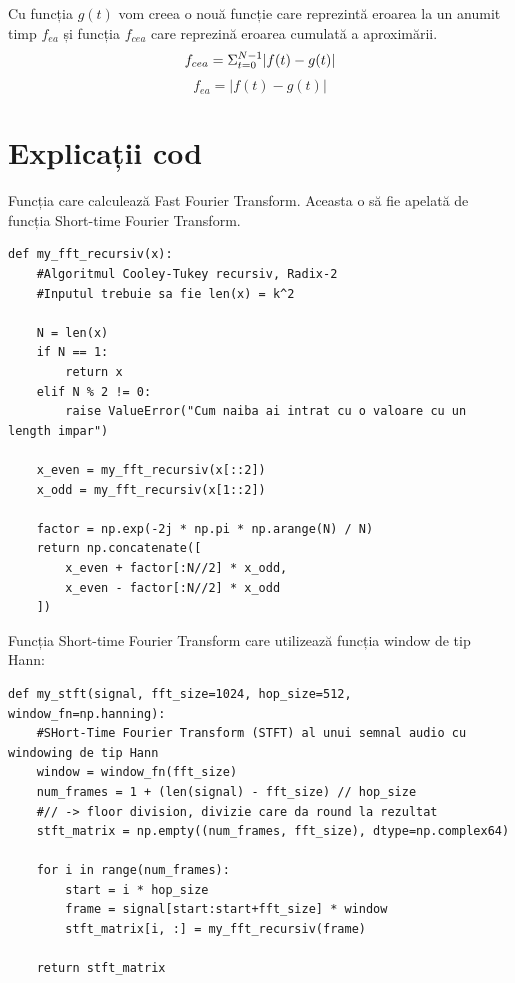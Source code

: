 \documentclass[12pt]{article}
\begin{document}
Cu funcția $g(t)$ vom creea o nouă funcție care reprezintă eroarea la un anumit timp $f_{ea}$ și funcția $f_{cea}$ care reprezină eroarea cumulată a aproximării.
\begin{equation}
    f_{cea} = \Sigma_{t=0}^{N-1} |f(t) - g(t)| \\[4pt]
\end{equation}
\begin{equation}
    f_{ea} = |f(t) - g(t)|
\end{equation}

\section{Explicații cod}

Funcția care calculează Fast Fourier Transform. Aceasta o să fie apelată de funcția Short-time Fourier Transform.

\begin{lstlisting}
def my_fft_recursiv(x):
    #Algoritmul Cooley-Tukey recursiv, Radix-2
    #Inputul trebuie sa fie len(x) = k^2

    N = len(x)
    if N == 1:
        return x
    elif N % 2 != 0:
        raise ValueError("Cum naiba ai intrat cu o valoare cu un length impar")
    
    x_even = my_fft_recursiv(x[::2])
    x_odd = my_fft_recursiv(x[1::2])

    factor = np.exp(-2j * np.pi * np.arange(N) / N)
    return np.concatenate([
        x_even + factor[:N//2] * x_odd,
        x_even - factor[:N//2] * x_odd
    ])
\end{lstlisting}

Funcția Short-time Fourier Transform care utilizează funcția window de tip Hann:

\begin{lstlisting}
def my_stft(signal, fft_size=1024, hop_size=512, window_fn=np.hanning):
    #SHort-Time Fourier Transform (STFT) al unui semnal audio cu windowing de tip Hann
    window = window_fn(fft_size)
    num_frames = 1 + (len(signal) - fft_size) // hop_size
    #// -> floor division, divizie care da round la rezultat
    stft_matrix = np.empty((num_frames, fft_size), dtype=np.complex64)

    for i in range(num_frames):
        start = i * hop_size
        frame = signal[start:start+fft_size] * window
        stft_matrix[i, :] = my_fft_recursiv(frame)
    
    return stft_matrix
\end{lstlisting}
\end{document}
